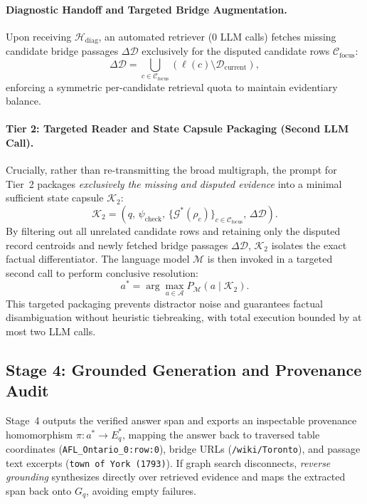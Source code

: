 \documentclass[runningheads]{llncs}
\begin{document}
\paragraph{Diagnostic Handoff and Targeted Bridge Augmentation.}
Upon receiving $\mathcal{H}_{\text{diag}}$, an automated retriever (0 LLM calls) fetches missing candidate bridge passages $\Delta\mathcal{D}$ exclusively for the disputed candidate rows $\mathcal{C}_{\text{focus}}$:
\begin{equation}
\label{eq:targeted-retrieval}
\Delta \mathcal{D} = \bigcup_{c \in \mathcal{C}_{\text{focus}}} \left( \ell(c) \setminus \mathcal{D}_{\text{current}} \right),
\end{equation}
enforcing a symmetric per-candidate retrieval quota to maintain evidentiary balance.

\paragraph{Tier 2: Targeted Reader and State Capsule Packaging (Second LLM Call).}
Crucially, rather than re-transmitting the broad multigraph, the prompt for Tier~2 packages \emph{exclusively the missing and disputed evidence} into a minimal sufficient state capsule $\mathcal{K}_2$:
\begin{equation}
\label{eq:l2-capsule}
\mathcal{K}_2 = \left( q, \, \psi_{\text{check}}, \, \{ \mathcal{G}^*(\rho_c) \}_{c \in \mathcal{C}_{\text{focus}}}, \, \Delta \mathcal{D} \right).
\end{equation}
By filtering out all unrelated candidate rows and retaining only the disputed record centroids and newly fetched bridge passages $\Delta \mathcal{D}$, $\mathcal{K}_2$ isolates the exact factual differentiator. The language model $\mathcal{M}$ is then invoked in a targeted second call to perform conclusive resolution:
\begin{equation}
a^* = \arg\max_{a \in \mathcal{A}} P_{\mathcal{M}}(a \mid \mathcal{K}_2).
\end{equation}
This targeted packaging prevents distractor noise and guarantees factual disambiguation without heuristic tiebreaking, with total execution bounded by at most two LLM calls.

\subsection{Stage 4: Grounded Generation and Provenance Audit}
\label{sec:method-answer}
Stage~4 outputs the verified answer span and exports an inspectable provenance homomorphism $\pi: a^* \rightarrow E_q^*$, mapping the answer back to traversed table coordinates (\texttt{AFL\_Ontario\_0:row:0}), bridge URLs (\texttt{/wiki/Toronto}), and passage text excerpts (\texttt{town of York (1793)}). If graph search disconnects, \emph{reverse grounding} synthesizes directly over retrieved evidence and maps the extracted span back onto $G_q$, avoiding empty failures.
\end{document}
